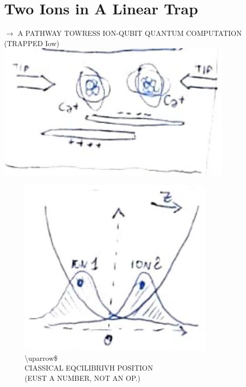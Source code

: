 \documentclass[10pt]{article}
\begin{document}
\captionsetup{singlelinecheck=false}
\section*{Two Ions in A Linear Trap}
$\rightarrow$ A PATHWAY TOWRESS ION-QUBIT QUANTUM COMPUTATION (TRAPPED Iow)\\
\includegraphics[max width=\textwidth, center]{2025_10_16_f28de32ab20bd0ac9bbfg-1(1)}

\begin{figure}[h]
\begin{center}
  \includegraphics[width=\textwidth]{2025_10_16_f28de32ab20bd0ac9bbfg-1(2)}
\captionsetup{labelformat=empty}
\caption{\textbackslash uparrow\$\\
CIASSICAL EQCILIBRIVH POSITION\\
(EUST A NUMBER, NOT AN OP.)}
\end{center}
\end{figure}
\end{document}
